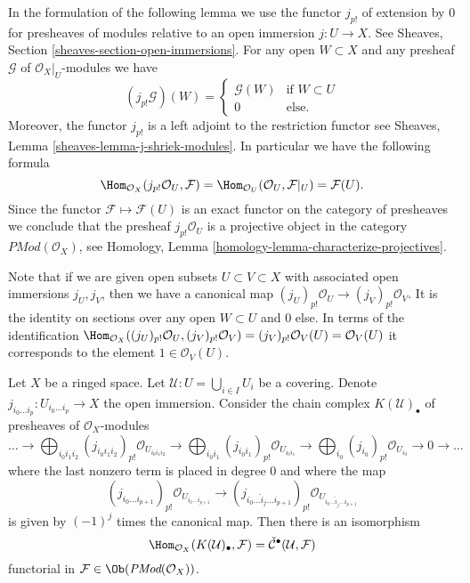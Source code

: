 \noindent
In the formulation of the following lemma we use the functor $j_{p!}$ of
extension by $0$ for presheaves of modules
relative to an open immersion $j : U \to X$.
See Sheaves, Section \ref{sheaves-section-open-immersions}. For any open
$W \subset X$ and any presheaf $\mathcal{G}$ of $\mathcal{O}_X|_U$-modules
we have
$$
(j_{p!}\mathcal{G})(W) =
\left\{
\begin{matrix}
\mathcal{G}(W) & \text{if } W \subset U \\
0 & \text{else.}
\end{matrix}
\right.
$$
Moreover, the functor $j_{p!}$ is a left adjoint to the restriction functor
see Sheaves, Lemma \ref{sheaves-lemma-j-shriek-modules}.
In particular we have the following formula
$$
\Hom_{\mathcal{O}_X}(j_{p!}\mathcal{O}_U, \mathcal{F})
=
\Hom_{\mathcal{O}_U}(\mathcal{O}_U, \mathcal{F}|_U)
=
\mathcal{F}(U).
$$
Since the functor $\mathcal{F} \mapsto \mathcal{F}(U)$ is an exact functor
on the category of presheaves we conclude that the presheaf
$j_{p!}\mathcal{O}_U$ is a projective object in the category
$\textit{PMod}(\mathcal{O}_X)$, see
Homology, Lemma \ref{homology-lemma-characterize-projectives}.

\medskip\noindent
Note that if we are given open subsets $U \subset V \subset X$
with associated open immersions $j_U, j_V$, then we have a canonical
map $(j_U)_{p!}\mathcal{O}_U \to (j_V)_{p!}\mathcal{O}_V$. It is the
identity on sections over any open $W \subset U$ and $0$ else.
In terms of the identification
$\Hom_{\mathcal{O}_X}((j_U)_{p!}\mathcal{O}_U, (j_V)_{p!}\mathcal{O}_V) =
(j_V)_{p!}\mathcal{O}_V(U) = \mathcal{O}_V(U)$ it corresponds to
the element $1 \in \mathcal{O}_V(U)$.

\begin{lemma}
\label{lemma-cech-map-into}
Let $X$ be a ringed space.
Let $\mathcal{U} : U = \bigcup_{i \in I} U_i$ be a covering.
Denote $j_{i_0\ldots i_p} : U_{i_0 \ldots i_p} \to X$ the open immersion.
Consider the chain complex $K(\mathcal{U})_\bullet$
of presheaves of $\mathcal{O}_X$-modules
$$
\ldots
\to
\bigoplus_{i_0i_1i_2} (j_{i_0i_1i_2})_{p!}\mathcal{O}_{U_{i_0i_1i_2}}
\to
\bigoplus_{i_0i_1} (j_{i_0i_1})_{p!}\mathcal{O}_{U_{i_0i_1}}
\to
\bigoplus_{i_0} (j_{i_0})_{p!}\mathcal{O}_{U_{i_0}}
\to 0 \to \ldots
$$
where the last nonzero term is placed in degree $0$
and where the map
$$
(j_{i_0\ldots i_{p + 1}})_{p!}\mathcal{O}_{U_{i_0\ldots i_{p + 1}}}
\longrightarrow
(j_{i_0\ldots \hat i_j \ldots i_{p + 1}})_{p!}
\mathcal{O}_{U_{i_0\ldots \hat i_j \ldots i_{p + 1}}}
$$
is given by $(-1)^j$ times the canonical map.
Then there is an isomorphism
$$
\Hom_{\mathcal{O}_X}(K(\mathcal{U})_\bullet, \mathcal{F})
=
\check{\mathcal{C}}^\bullet(\mathcal{U}, \mathcal{F})
$$
functorial in $\mathcal{F} \in \Ob(\textit{PMod}(\mathcal{O}_X))$.
\end{lemma}

